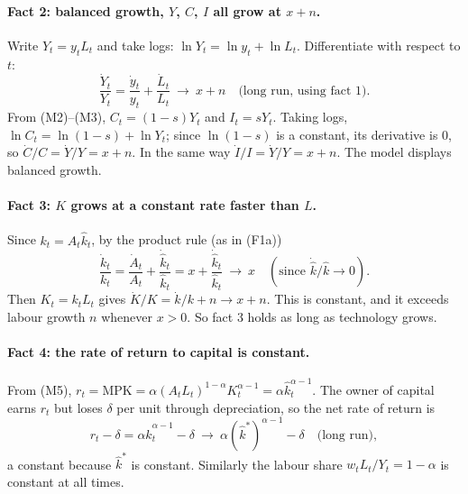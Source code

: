 \paragraph{Fact 2: balanced growth, $Y$, $C$, $I$ all grow at $x+n$.}
Write $Y_t=y_tL_t$ and take logs: $\ln Y_t=\ln y_t+\ln L_t$. Differentiate with respect to $t$:
\[
\frac{\dot Y_t}{Y_t}=\frac{\dot y_t}{y_t}+\frac{\dot L_t}{L_t}\ \longrightarrow\ x+n\quad\text{(long run, using fact 1)}.
\]
From (M2)--(M3), $C_t=(1-s)Y_t$ and $I_t=sY_t$. Taking logs, $\ln C_t=\ln(1-s)+\ln Y_t$; since $\ln(1-s)$ is a constant, its derivative is $0$, so $\dot C/C=\dot Y/Y=x+n$. In the same way $\dot I/I=\dot Y/Y=x+n$. The model displays balanced growth.

\paragraph{Fact 3: $K$ grows at a constant rate faster than $L$.}
Since $k_t=A_t\hat k_t$, by the product rule (as in (F1a))
\[
\frac{\dot k_t}{k_t}=\frac{\dot A_t}{A_t}+\frac{\dot{\hat k}_t}{\hat k_t} = x+\frac{\dot{\hat k}_t}{\hat k_t}\ \longrightarrow\ x \quad(\text{since } \dot{\hat k}/\hat k\to 0).
\]
Then $K_t=k_tL_t$ gives $\dot K/K=\dot k/k+n\to x+n$. This is constant, and it exceeds labour growth $n$ whenever $x>0$. So fact 3 holds as long as technology grows.

\paragraph{Fact 4: the rate of return to capital is constant.}
From (M5), $r_t=\text{MPK}=\alpha(A_tL_t)^{1-\alpha}K_t^{\alpha-1}=\alpha\hat k_t^{\alpha-1}$. The owner of capital earns $r_t$ but loses $\delta$ per unit through depreciation, so the net rate of return is
\[
r_t-\delta=\alpha\hat k_t^{\alpha-1}-\delta\ \longrightarrow\ \alpha(\hat k^*)^{\alpha-1}-\delta \quad\text{(long run)},
\]
a constant because $\hat k^*$ is constant. Similarly the labour share $w_tL_t/Y_t=1-\alpha$ is constant at all times.

